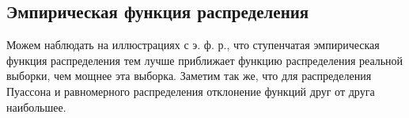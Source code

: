 \subsection{Эмпирическая функция распределения}
Можем наблюдать на иллюстрациях с э. ф. р., что ступенчатая эмпирическая функция распределения тем лучше приближает функцию распределения реальной выборки, чем мощнее эта выборка. Заметим так же, что для
распределения Пуассона и равномерного распределения отклонение функций друг от друга наибольшее.